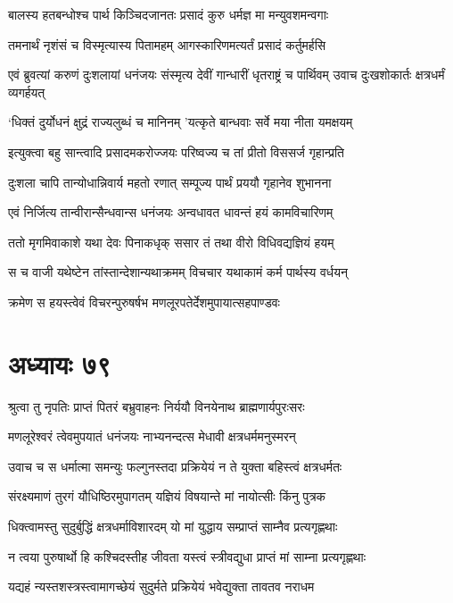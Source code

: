 \twolineshloka
{बालस्य हतबन्धोश्च पार्थ किञ्चिदजानतः}
{प्रसादं कुरु धर्मज्ञ मा मन्युवशमन्वगाः}


\twolineshloka
{तमनार्थं नृशंसं च विस्मृत्यास्य पितामहम्}
{आगस्कारिणमत्यर्तं प्रसादं कर्तुमर्हसि}


\threelineshloka
{एवं ब्रुवत्यां करुणं दुःशलायां धनंजयः}
{संस्मृत्य देवीं गान्धारीं धृतराष्ट्रं च पार्थिवम्}
{उवाच दुःखशोकार्तः क्षत्रधर्मं व्यगर्हयत्}


\twolineshloka
{`धिक्तं दुर्योधनं क्षुद्रं राज्यलुब्धं च मानिनम्}
{'यत्कृते बान्धवाः सर्वे मया नीता यमक्षयम्}


\twolineshloka
{इत्युक्त्वा बहु सान्त्वादि प्रसादमकरोज्जयः}
{परिष्वज्य च तां प्रीतो विससर्ज गृहान्प्रति}


\twolineshloka
{दुःशला चापि तान्योधान्निवार्य महतो रणात्}
{सम्पूज्य पार्थं प्रययौ गृहानेव शुभानना}


\twolineshloka
{एवं निर्जित्य तान्वीरान्सैन्धवान्स धनंजयः}
{अन्वधावत धावन्तं हयं कामविचारिणम्}


\twolineshloka
{ततो मृगमिवाकाशे यथा देवः पिनाकधृक्}
{ससार तं तथा वीरो विधिवद्यज्ञियं हयम्}


\twolineshloka
{स च वाजी यथेष्टेन तांस्तान्देशान्यथाक्रमम्}
{विचचार यथाकामं कर्म पार्थस्य वर्धयन्}


\twolineshloka
{क्रमेण स हयस्त्वेवं विचरन्पुरुषर्षभ}
{मणलूरपतेर्देशमुपायात्सहपाण्डवः}


\chapter{अध्यायः ७९}
\twolineshloka
{श्रुत्वा तु नृपतिः प्राप्तं पितरं बभ्रुवाहनः}
{निर्ययौ विनयेनाथ ब्राह्मणार्यपुरःसरः}


\twolineshloka
{मणलूरेश्वरं त्वेवमुपयातं धनंजयः}
{नाभ्यनन्दत्स मेधावी क्षत्रधर्ममनुस्मरन्}


\twolineshloka
{उवाच च स धर्मात्मा समन्युः फल्गुनस्तदा}
{प्रक्रियेयं न ते युक्ता बहिस्त्वं क्षत्रधर्मतः}


\twolineshloka
{संरक्ष्यमाणं तुरगं यौधिष्ठिरमुपागतम्}
{यज्ञियं विषयान्ते मां नायोत्सीः किंनु पुत्रक}


\twolineshloka
{धिक्त्वामस्तु सुदुर्बुद्धिं क्षत्रधर्माविशारदम्}
{यो मां युद्धाय सम्प्राप्तं साम्नैव प्रत्यगृह्णथाः}


\twolineshloka
{न त्वया पुरुषार्थो हि कश्चिदस्तीह जीवता}
{यस्त्वं स्त्रीवद्युधा प्राप्तं मां साम्ना प्रत्यगृह्णथाः}


\twolineshloka
{यद्यहं न्यस्तशस्त्रस्त्वामागच्छेयं सुदुर्मते}
{प्रक्रियेयं भवेद्युक्ता तावतव नराधम}


